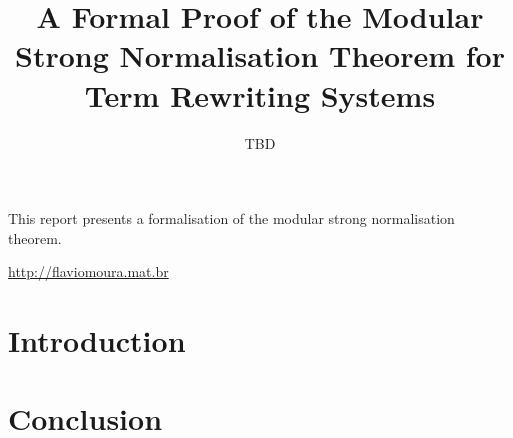 \documentclass[12pt]{llncs}
\title{A Formal Proof of the Modular Strong Normalisation Theorem for Term Rewriting Systems}
\author{TBD}
\begin{document}
\maketitle

This report presents a formalisation of the modular strong normalisation theorem.

\begin{center} \url{http://flaviomoura.mat.br} \end{center}

\thispagestyle{empty}
\mbox{}\vfill


\section{Introduction}



\section{Conclusion}

\clearpage



\end{document}
